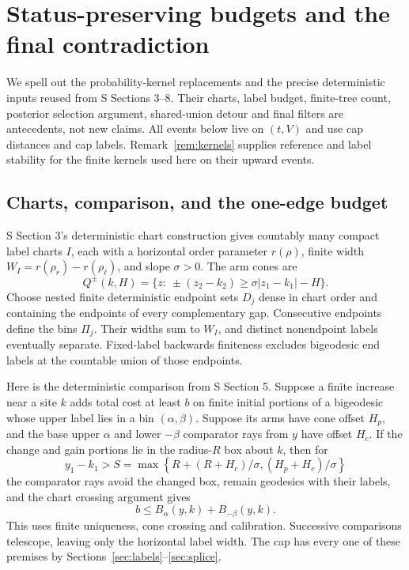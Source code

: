 \section{Status-preserving budgets and the final contradiction}\label{sec:finish}
We spell out the probability-kernel replacements and the precise deterministic
inputs reused from S Sections 3--8. Their charts, label budget, finite-tree
count, posterior selection argument, shared-union detour and final filters
are antecedents, not new claims. All events below live on $(t,V)$ and use
cap distances and cap labels. Remark~\ref{rem:kernels} supplies reference
and label stability for the finite kernels used here on their upward events.

\subsection{Charts, comparison, and the one-edge budget}
S Section 3's deterministic chart construction gives countably many compact
label charts $I$, each with a horizontal order parameter $r(\rho)$, finite
width $W_I=r(\rho_r)-r(\rho_\ell)$, and slope $\sigma>0$. The arm cones are
\[
 Q^\pm(k,H)=\{z:\ \pm(z_2-k_2)\ge\sigma|z_1-k_1|-H\}.
\]
Choose nested finite deterministic endpoint sets $D_j$ dense in chart
order and containing the endpoints of every complementary gap. Consecutive
endpoints define the bins $\Pi_j$. Their widths sum to $W_I$, and distinct
nonendpoint labels eventually separate. Fixed-label backwards finiteness
excludes bigeodesic end labels at the countable union of those endpoints.

Here is the deterministic comparison from S Section 5. Suppose a finite
increase near a site $k$ adds total cost at least $b$ on finite initial
portions of a bigeodesic whose upper label lies in a bin $(\alpha,\beta)$.
Suppose its arms have cone offset $H_p$, and the base upper $\alpha$ and
lower $-\beta$ comparator rays from $y$ have offset $H_c$. If the change
and gain portions lie in the radius-$R$ box about $k$, then for
\[
 y_1-k_1>S=\max\left\{R+(R+H_c)/\sigma,(H_p+H_c)/\sigma\right\}
\]
the comparator rays avoid the changed box, remain geodesics with their
labels, and the chart crossing argument gives
\begin{equation}\label{eq:budget}
 b\le B_\alpha(y,k)+B_{-\beta}(y,k).
\end{equation}
This uses finite uniqueness, cone crossing and calibration. Successive
comparisons telescope, leaving only the horizontal label width. The cap
has every one of these premises by Sections~\ref{sec:labels}--\ref{sec:splice}.

